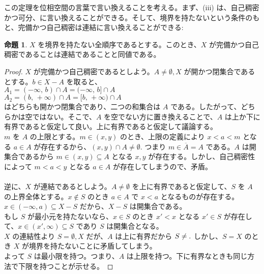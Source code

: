 \documentclass{jsarticle}
\theoremstyle{definition}
\newtheorem{proposition}[theorem]{命題}
\begin{document}
    \vspace{1.0ex}
    
    この定理を位相空間の言葉で言い換えることを考える。まず、(iii) は、自己稠密かつ可分、に言い換えることができる。そして、境界を持たないという条件のもと、完備かつ自己稠密は連結に言い換えることができる:
    
    \vspace{1.0ex}
    
    \begin{proposition}
        $X$ を境界を持たない全順序であるとする。このとき、$X$ が完備かつ自己稠密であることは連結であることと同値である。
    \end{proposition}
    \begin{proof}
        $X$ が完備かつ自己稠密であるとしよう。$A \neq \emptyset, X$ が開かつ閉集合であるとする。$b \in X - A$ を取ると、\\
        $A_1 = (-\infty, \, b) \cap A = (-\infty, \, b] \cap A$\\
        $A_2 = (b, \, +\infty) \cap A = [b, \, +\infty) \cap A$\\
        はどちらも開かつ閉集合であり、二つの和集合は $A$ である。したがって、どちらかは空ではない。そこで、$A$ を空でない方に置き換えることで、$A$ は上か下に有界であると仮定して良い。上に有界であると仮定して議論する。\\
        $m$ を $A$ の上限とする。$m \in (x, y)$ のとき、上限の定義により $x < a < m$ となる $a \in A$ が存在するから、$(x, y) \cap A \neq \emptyset.$ つまり $m \in \overline{A} = A$ である。$A$ は開集合であるから $m \in (x, y) \subseteq A$ となる $x, y$ が存在する。しかし、自己稠密性によって $m < a < y$ となる $a \in A$ が存在してしまうので、矛盾。\\
        \ \\
        逆に、$X$ が連結であるとしよう。$A\neq\emptyset$ を上に有界であると仮定して、$S$ を $A$ の上界全体とする。$x \not\in S$ のとき $a \in A$ で $x < a$ となるものが存在する。$x \in (-\infty, a) \subseteq X-S$ だから、$X-S$ は開集合である。\\
        もし $S$ が最小元を持たないなら、$x \in S$ のとき $x' < x$ となる $x' \in S$ が存在して、$x \in (x', \infty) \subseteq S$ であり $S$ は開集合となる。\\
        $X$ の連結性より $S = \emptyset, X$ だが、$A$ は上に有界だから $S \neq \empty.$ しかし、$S = X$ のとき $X$ が境界を持たないことに矛盾してしまう。\\
        よって $S$ は最小限を持つ。つまり、$A$ は上限を持つ。下に有界なときも同じ方法で下限を持つことが示せる。
    \end{proof}
    
\end{document}
